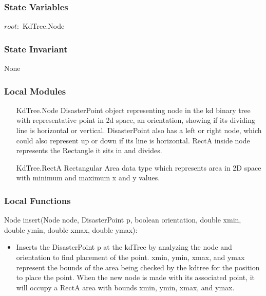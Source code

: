 \documentclass[12pt]{article}
\begin{document}
                \subsubsection* {State Variables}
                
                $root:$ KdTree.Node\\
                    
                \subsubsection* {State Invariant}
                
                None
                
                \subsubsection* {Local Modules}
                
                \begin{itemize}
                    \item[KdTree.Node] DisasterPoint object representing node in the kd binary tree with 
                                	   representative point in 2d space, an orientation, showing
                                	   if its dividing line is horizontal or vertical. DisasterPoint also has a
                                	   left or right node, which could also represent up or down if its
                                	   line is horizontal. RectA inside node represents the Rectangle it 
                                	   sits in and divides.
                    \item[KdTree.RectA] Rectangular Area data type which represents area in
	                                    2D space with minimum and maximum x and y values.
                \end{itemize}
                
                \subsubsection* {Local Functions}
                
                \noindent Node insert(Node node, DisasterPoint p, boolean orientation, double xmin, double ymin, double xmax, double ymax):
			    \begin{itemize}
			        \item Inserts the DisasterPoint p at the kdTree by analyzing the node and orientation
                	 to find placement of the point. xmin, ymin, xmax, and ymax represent the bounds
                	 of the area being checked by the kdtree for the position to place the point.
                	 When the new node is made with its associated point, it will occupy a RectA area
                	 with bounds xmin, ymin, xmax, and ymax.
			    \end{itemize}
			    
\end{document}
